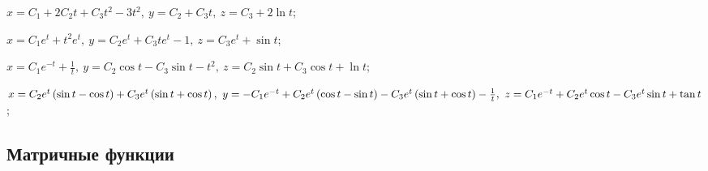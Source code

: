 \begin{enumsolsfull}
		\label{sol:linsys_nonhmg:hard}
		\item \( x = C_1 + 2C_2t + C_3t^2 - 3t^2, ~ y = C_2 + C_3t, ~ z = C_3 + 2 \ln{t} \); %
		\item \( x = C_1e^{t} + t^2 e^t, ~ y = C_2 e^{t} + C_3 t e^{t} - 1, ~ z = C_3 e^{t} + \sin{t} \); %
		\item \( x = C_1e^{-t} + \frac{1}{t}, ~ y = C_2 \cos{t} - C_3 \sin{t} - t^2, ~ z = C_2 \sin{t} + C_3 \cos{t} + \ln{t} \); %
		\item \( x = C_2 e^{t} \left( \sin{t} - \cos{t} \right) + C_3 e^{t} \left( \sin{t} + \cos{t} \right), ~ y = -C_1 e^{-t} + C_2 e^{t} \left( \cos{t} - \sin{t} \right) - C_3 e^{t} \left( \sin{t} + \cos{t} \right) - \frac{1}{t}, ~ z = C_1 e^{-t} + C_2 e^{t} \cos{t} - C_3 e^{t} \sin{t} + \tan{t} \); %

	\end{enumsolsfull}

\subsection*{Матричные функции}

